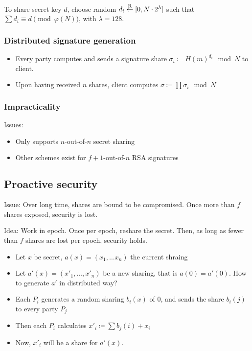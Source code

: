 To share secret key $d$, choose random $d_i \overset{\mathrm{R}}{\gets} [0, N \cdot 2^\lambda]$ such
that $\sum d_i \equiv d \pmod{\varphi(N)}$, with $\lambda = 128$.


\subsubsection{Distributed signature generation}

\begin{itemize}
		\item Every party computes and sends a signature share $\sigma_i
				\coloneqq H(m)^{d_i} \mod N$ to client.
		\item Upon having received $n$ shares, client computes $\sigma
				\coloneqq \prod \sigma_i \mod N$
\end{itemize}


\subsubsection{Impracticality}

Issues:
\begin{itemize}
		\item Only supports $n$-out-of-$n$ secret sharing
		\item Other schemes exist for $f+1$-out-of-$n$ RSA signatures
\end{itemize}

\subsection{Proactive security}

Issue: Over long time, shares are bound to be compromised. Once more than $f$
shares exposed, security is lost.

Idea: Work in epoch. Once per epoch, reshare the secret. Then, as long as fewer
than $f$ shares are lost per epoch, security holds.

\begin{itemize}
		\item Let $x$ be secret, $a(x) = (x_1, \ldots x_n)$ the current shraing
		\item Let $a'(x) = (x'_1, \ldots, x'_n)$ be a new sharing, that is
				$a(0) = a'(0)$. How to generate $a'$ in distributed way?

		\item Each $P_i$ generates a random sharing $b_i(x)$ of $0$, and sends
				the share $b_i(j)$ to every party $P_j$
		\item Then each $P_i$ calculates $x'_i \coloneqq \sum b_j(i) + x_i$
		\item Now, $x'_i$ will be a share for $a'(x)$.
\end{itemize}
